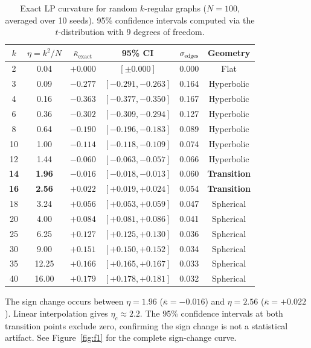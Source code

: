 \documentclass[12pt]{article}
\newcommand{\kbar}{\bar{\kappa}}
\newcommand{\etac}{\eta_c}
\begin{document}
\begin{table}[ht]
\centering
\caption{Exact LP curvature for random $k$-regular graphs ($N = 100$, averaged over 10
seeds). 95\% confidence intervals computed via the $t$-distribution with 9 degrees of
freedom.}
\label{tab:n100}
\begin{tabular}{ccccc c}
\toprule
$k$ & $\eta = k^2/N$ & $\kbar_{\mathrm{exact}}$ & 95\% CI & $\sigma_{\mathrm{edges}}$ & Geometry \\
\midrule
2  & 0.04  & $+0.000$ & $[\pm 0.000]$      & 0.000 & Flat       \\
3  & 0.09  & $-0.277$ & $[-0.291, -0.263]$ & 0.164 & Hyperbolic \\
4  & 0.16  & $-0.363$ & $[-0.377, -0.350]$ & 0.167 & Hyperbolic \\
6  & 0.36  & $-0.302$ & $[-0.309, -0.294]$ & 0.127 & Hyperbolic \\
8  & 0.64  & $-0.190$ & $[-0.196, -0.183]$ & 0.089 & Hyperbolic \\
10 & 1.00  & $-0.114$ & $[-0.118, -0.109]$ & 0.074 & Hyperbolic \\
12 & 1.44  & $-0.060$ & $[-0.063, -0.057]$ & 0.066 & Hyperbolic \\
\textbf{14} & \textbf{1.96} & $\bm{-0.016}$ & $[-0.018, -0.013]$ & 0.060 & \textbf{Transition} \\
\textbf{16} & \textbf{2.56} & $\bm{+0.022}$ & $[+0.019, +0.024]$ & 0.054 & \textbf{Transition} \\
18 & 3.24  & $+0.056$ & $[+0.053, +0.059]$ & 0.047 & Spherical  \\
20 & 4.00  & $+0.084$ & $[+0.081, +0.086]$ & 0.041 & Spherical  \\
25 & 6.25  & $+0.127$ & $[+0.125, +0.130]$ & 0.036 & Spherical  \\
30 & 9.00  & $+0.151$ & $[+0.150, +0.152]$ & 0.034 & Spherical  \\
35 & 12.25 & $+0.166$ & $[+0.165, +0.167]$ & 0.033 & Spherical  \\
40 & 16.00 & $+0.179$ & $[+0.178, +0.181]$ & 0.032 & Spherical  \\
\bottomrule
\end{tabular}
\end{table}

The sign change occurs between $\eta = 1.96$ ($\kbar = -0.016$) and $\eta = 2.56$
($\kbar = +0.022$). Linear interpolation gives $\etac \approx 2.2$. The 95\% confidence
intervals at both transition points exclude zero, confirming the sign change is not a
statistical artifact. See Figure~\ref{fig:f1} for the complete sign-change curve.
\end{document}
